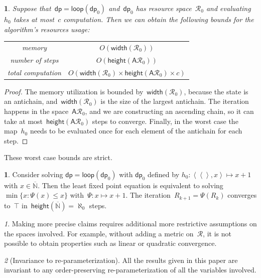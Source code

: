 \documentclass[twocolumn,english]{IEEEtran}
\providecommand{\tabularnewline}{\\}
\theoremstyle{definition}
\theoremstyle{plain}
\theoremstyle{definition}
\newtheorem{example}{\protect\examplename}
\theoremstyle{remark}
\newtheorem{rem}{\protect\remarkname}
\theoremstyle{definition}
\theoremstyle{plain}
\newtheorem{prop}{\protect\propositionname}
\theoremstyle{plain}
\newcommand{\aword}[1]{\mathsf{#1}}
\newcommand{\vmath}[1]{\aword{#1}}
\newcommand{\antichains}{\vmath{A}}
\newcommand{\posetwidth}{\vmath{width}}
\newcommand{\posetheight}{\vmath{height}}
\newcommand{\ftor}{{h}}
\newcommand{\ressp}{\mathscr{R}}
\newcommand{\dprob}{\vmath{dp}}
\newcommand{\dploop}{\vmath{loop}}
\providecommand{\examplename}{Example}
\providecommand{\propositionname}{Proposition}
\providecommand{\remarkname}{Remark}
\begin{document}
\begin{prop}
\label{prop:complexity}Suppose that~$\dprob=\dploop(\dprob_{0})$
and~$\dprob_{0}$ has resource space~$\ressp_{0}$ and evaluating~$\ftor_{0}$
takes at most~$c$ computation. Then we can obtain the following
bounds for the algorithm's resources usage:

\smallskip{}
\begin{tabular}{cc}
memory & $O(\posetwidth(\ressp_{0}))$\tabularnewline
number of steps & $O(\posetheight(\antichains\ressp_{0}))$\tabularnewline
total computation & $O(\posetwidth(\ressp_{0})\times\posetheight(\antichains\ressp_{0})\times c)$\tabularnewline
\end{tabular}

\end{prop}
\begin{proof}
The memory utilization is bounded by~$\posetwidth(\ressp_{0})$,
because the state is an antichain, and~$\posetwidth(\ressp_{0})$
is the size of the largest antichain. The iteration happens in the
space~$\antichains\ressp_{0}$, and we are constructing an ascending
chain, so it can take at most~$\posetheight(\antichains\ressp_{0})$
steps to converge. Finally, in the worst case the map~$\ftor_{0}$
needs to be evaluated once for each element of the antichain for each
step.
\end{proof}
These worst case bounds are strict. 
\begin{example}
Consider solving $\dprob=\dploop(\dprob_{0})$ with $\dprob_{0}$
defined by $\ftor_{0}\colon\left\langle \left\langle \right\rangle ,x\right\rangle \mapsto x+1$
with $x\in\overline{\mathbb{N}}$. Then the least fixed point equation
is equivalent to solving~$\min\{x\colon\Psi(x)\leq x\}$ with~$\Psi:x\mapsto x+1$.
The iteration~$R_{k+1}=\Psi(R_{k})$ converges to~$\top$ in~$\posetheight(\overline{\mathbb{N}})=\aleph_{0}$
steps.
\end{example}

\begin{rem}
Making more precise claims requires additional more restrictive assumptions
on the spaces involved. For example, without adding a metric on~$\ressp$,
it is not possible to obtain properties such as linear or quadratic
convergence. 
\end{rem}

\begin{rem}[Invariance to re-parameterization]
All the results given in this paper are invariant to any order-preserving
re-parameterization of all the variables involved. 
\end{rem}
\end{document}

